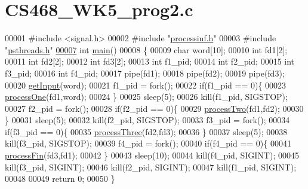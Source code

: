 \hypertarget{_c_s468___w_k5__prog2_8c_source}{\section{C\-S468\-\_\-\-W\-K5\-\_\-prog2.\-c}
}

\begin{DoxyCode}
00001 \textcolor{preprocessor}{#include <signal.h>}
00002 \textcolor{preprocessor}{#include "\hyperlink{processinf_8h}{processinf.h}"}
00003 \textcolor{preprocessor}{#include "\hyperlink{psthreads_8h}{psthreads.h}"}
\hypertarget{_c_s468___w_k5__prog2_8c_source_l00007}{}\hyperlink{_c_s468___w_k5__prog2_8c_ae66f6b31b5ad750f1fe042a706a4e3d4}{00007} \textcolor{keywordtype}{int} \hyperlink{_c_s468___w_k5__prog1_8c_ae66f6b31b5ad750f1fe042a706a4e3d4}{main}()
00008 \{
00009 \textcolor{keywordtype}{char} word[10];
00010 \textcolor{keywordtype}{int} fd1[2];
00011 \textcolor{keywordtype}{int} fd2[2];
00012 \textcolor{keywordtype}{int} fd3[2];
00013 \textcolor{keywordtype}{int} f1\_pid;
00014 \textcolor{keywordtype}{int} f2\_pid;
00015 \textcolor{keywordtype}{int} f3\_pid;
00016 \textcolor{keywordtype}{int} f4\_pid;
00017 pipe(fd1);
00018 pipe(fd2);
00019 pipe(fd3);
00020 \hyperlink{processinf_8c_ac908e9757328e0bd76c4f1735c0e23cf}{getInput}(word);
00021 f1\_pid = fork();
00022 \textcolor{keywordflow}{if}(f1\_pid == 0)\{
00023 \hyperlink{psthreads_8c_ad770c3fce36513614f685761ab978c84}{processOne}(fd1,word);
00024 \}
00025 sleep(5);
00026 kill(f1\_pid, SIGSTOP);
00027 f2\_pid = fork();
00028 \textcolor{keywordflow}{if}(f2\_pid == 0)\{
00029 \hyperlink{psthreads_8c_a41286be8a60549556fd52a785e55ceb3}{processTwo}(fd1,fd2);
00030 \}
00031 sleep(5);
00032 kill(f2\_pid, SIGSTOP);
00033 f3\_pid =  fork();
00034 \textcolor{keywordflow}{if}(f3\_pid == 0)\{
00035 \hyperlink{psthreads_8c_aa9e93a11d641259d16a36df89c644d00}{processThree}(fd2,fd3);
00036 \}
00037 sleep(5);
00038 kill(f3\_pid, SIGSTOP);
00039 f4\_pid = fork();
00040 \textcolor{keywordflow}{if}(f4\_pid == 0)\{
00041 \hyperlink{psthreads_8c_ad4fbf5e28b0ec1a60e850f9f1887c615}{processFin}(fd3,fd1);
00042 \}
00043 sleep(10);
00044 kill(f4\_pid, SIGINT);
00045 kill(f3\_pid, SIGINT);
00046 kill(f2\_pid, SIGINT);
00047 kill(f1\_pid, SIGINT);
00048 
00049 \textcolor{keywordflow}{return} 0;
00050 \}
\end{DoxyCode}
